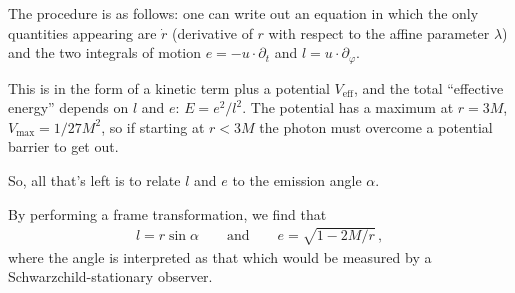 \documentclass[main.tex]{subfiles}
\begin{document}
The procedure is as follows: one can write out an equation in which the only quantities appearing are \(\dot{r}\) (derivative of \(r\) with respect to the affine parameter \(\lambda \)) and the two integrals of motion \(e = -u \cdot \partial_t\) and \(l = u \cdot \partial_\varphi \). 

This is in the form of a kinetic term plus a potential \(V _{\text{eff}}\), and the total ``effective energy'' depends on \(l\) and \(e\): \(E = e^2 / l^2\). 
The potential has a maximum at \(r= 3M\), \(V _{\text{max}} = 1/ 27 M^2\), so if starting at \(r < 3M\) the photon must overcome a potential barrier to get out.

So, all that's left is to relate \(l\) and \(e\) to the emission angle \(\alpha \). 

By performing a frame transformation, we find that %
\begin{align}
l = r \sin \alpha \qquad \text{and} \qquad
e = \sqrt{1 - 2M / r}
\,,
\end{align}
%
where the angle is interpreted as that which would be measured by a Schwarzchild-stationary observer.
\end{document}
